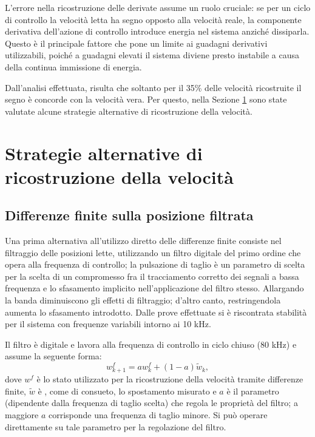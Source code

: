 L'errore nella ricostruzione delle derivate assume un ruolo cruciale: se per un ciclo di controllo la velocità letta ha segno opposto alla velocità reale, la componente derivativa dell'azione di controllo introduce energia nel sistema anziché dissiparla. Questo è il principale fattore che pone un limite ai guadagni derivativi utilizzabili, poiché a guadagni elevati il sistema diviene presto instabile a causa della continua immissione di energia. 

Dall'analisi effettuata, risulta che soltanto per il 35\% delle velocità ricostruite il segno è concorde con la velocità vera. Per questo, nella Sezione \ref{sec:recons} sono state valutate alcune strategie alternative di ricostruzione della velocità.

\section{Strategie alternative di ricostruzione della velocità}
\label{sec:recons}
\subsection{Differenze finite sulla posizione filtrata}
Una prima alternativa all'utilizzo diretto delle differenze finite consiste nel filtraggio delle posizioni lette, utilizzando un filtro digitale del primo ordine che opera alla frequenza di controllo; la pulsazione di taglio è un parametro di scelta per la scelta di un compromesso fra il tracciamento corretto dei segnali a bassa frequenza e lo sfasamento implicito nell'applicazione del filtro stesso. Allargando la banda diminuiscono gli effetti di filtraggio; d'altro canto, restringendola aumenta lo sfasamento introdotto. Dalle prove effettuate si è riscontrata stabilità per il sistema con frequenze variabili intorno ai 10 kHz.

Il filtro è digitale e lavora alla frequenza di controllo in ciclo chiuso ($80$ kHz) e assume la seguente forma:
\begin{equation}
\label{eq:8filtro1}
w^f_{k+1} = a w^f_{k}+(1-a)\tilde{w}_k,
\end{equation}
dove $w^f$ è lo stato utilizzato per la ricostruzione della velocità tramite differenze finite, $\tilde{w}$ è , come di consueto, lo spostamento misurato e $a$ è il parametro (dipendente dalla frequenza di taglio scelta) che regola le proprietà del filtro; a maggiore $a$ corrisponde una frequenza di taglio minore. Si può operare direttamente su tale parametro per la regolazione del filtro.\\

